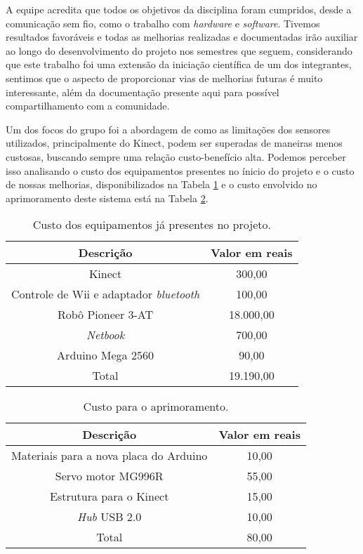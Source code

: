 A equipe acredita que todos os objetivos da disciplina foram cumpridos, desde a comunicação sem fio, como o trabalho com \textit{hardware} e \textit{software}. Tivemos resultados favoráveis e todas as melhorias realizadas e documentadas irão auxiliar ao longo do desenvolvimento do projeto nos semestres que seguem, considerando que este trabalho foi uma extensão da iniciação científica de um dos integrantes, sentimos que o aspecto de proporcionar vias de melhorias futuras é muito interessante, além da documentação presente aqui para possível compartilhamento com a comunidade.

Um dos focos do grupo foi a abordagem de como as limitações dos sensores utilizados, principalmente do Kinect, podem ser superadas de maneiras menos custosas, buscando sempre uma relação custo-benefício alta. Podemos perceber isso analisando o custo dos equipamentos presentes no ínicio do projeto e o custo de nossas melhorias, disponibilizados na Tabela \ref{tab:custoAnterior} e o custo envolvido no aprimoramento deste sistema está na Tabela \ref{tab:custoNosso}.


\begin{table}[h]
\caption{\small{Custo dos equipamentos já presentes no projeto.}}
\begin{center}
\begin{tabular}{c|c}
\hline
Descrição & Valor em reais \\
\hline
Kinect & 300,00 \\ 
Controle de Wii e adaptador \textit{bluetooth} & 100,00 \\  
Robô Pioneer 3-AT & 18.000,00 \\ 
\textit{Netbook} & 700,00 \\
Arduino Mega 2560 & 90,00 \\
\hline
Total & 19.190,00 \\
\hline
\end{tabular}
\end{center}
\label{tab:custoAnterior}
\end{table}

\begin{table}[h]
\caption{\small{Custo para o aprimoramento.}}
\begin{center}
\begin{tabular}{c|c}
\hline
Descrição & Valor em reais \\
\hline
Materiais para a nova placa do Arduino & 10,00 \\ 
Servo motor MG996R & 55,00 \\  
Estrutura para o Kinect & 15,00 \\ 
\textit{Hub} USB 2.0 & 10,00 \\
\hline
Total & 80,00 \\
\hline
\end{tabular}
\end{center}
\label{tab:custoNosso}
\end{table}

